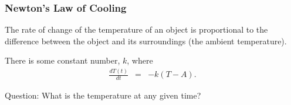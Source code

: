 \begin{frame}
  \frametitle{Newton's Law of Cooling}

  The rate of change of the temperature of an object is proportional
  to the difference between the object and its surroundings (the
  ambient temperature).

    There is some constant number, $k$, where 
    \begin{eqnarray*}
      \frac{dT(t)}{dt} & = & -k (T-A).
    \end{eqnarray*}

    Question: What is the temperature at any given time?

\end{frame}


